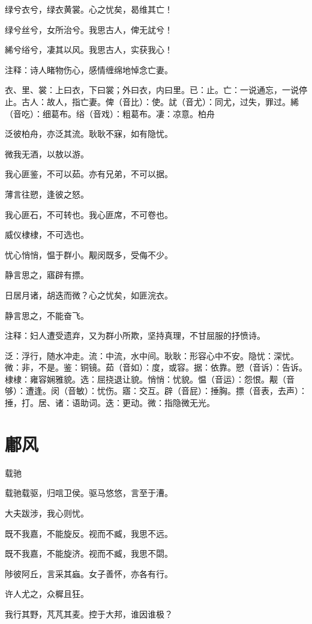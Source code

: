 \documentclass[12pt,UTF8]{ctexbook}
\begin{document}
绿兮衣兮，绿衣黄裳。心之忧矣，曷维其亡！

绿兮丝兮，女所治兮。我思古人，俾无訧兮！

絺兮绤兮，凄其以风。我思古人，实获我心！

注释：诗人睹物伤心，感情缠绵地悼念亡妻。

衣、里、裳：上曰衣，下曰裳；外曰衣，内曰里。已：止。亡：一说通忘，一说停止。古人：故人，指亡妻。俾（音比）：使。訧（音尤）：同尤，过失，罪过。絺（音吃）：细葛布。绤（音戏）：粗葛布。凄：凉意。柏舟

泛彼柏舟，亦泛其流。耿耿不寐，如有隐忧。

微我无酒，以敖以游。

我心匪鉴，不可以茹。亦有兄弟，不可以据。

薄言往愬，逢彼之怒。

我心匪石，不可转也。我心匪席，不可卷也。

威仪棣棣，不可选也。

忧心悄悄，愠于群小。觏闵既多，受侮不少。

静言思之，寤辟有摽。

日居月诸，胡迭而微？心之忧矣，如匪浣衣。

静言思之，不能奋飞。

注释：妇人遭受遗弃，又为群小所欺，坚持真理，不甘屈服的抒愤诗。

泛：浮行，随水冲走。流：中流，水中间。耿耿：形容心中不安。隐忧：深忧。微：非，不是。鉴：铜镜。茹（音如）：度，或容。据：依靠。愬（音诉）：告诉。棣棣：雍容娴雅貌。选：屈挠退让貌。悄悄：忧貌。愠（音运）：怨恨。觏（音够）：遭逢。闵（音敏）：忧伤。寤：交互。辟（音屁）：捶胸。摽（音表，去声）：捶，打。居、诸：语助词。迭：更动。微：指隐微无光。



\part{鄘风}

载驰

载驰载驱，归唁卫侯。驱马悠悠，言至于漕。

大夫跋涉，我心则忧。

既不我嘉，不能旋反。视而不臧，我思不远。

既不我嘉，不能旋济。视而不臧，我思不閟。

陟彼阿丘，言采其蝱。女子善怀，亦各有行。

许人尤之，众樨且狂。

我行其野，芃芃其麦。控于大邦，谁因谁极？
\end{document}
